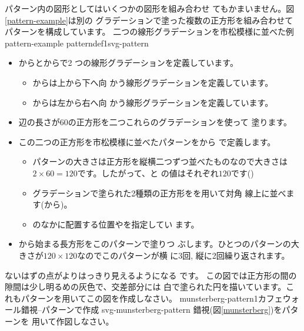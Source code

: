 パターン内の図形としてはいくつかの図形を組み合わせ
てもかまいません。図\ref{pattern-example}は別の
グラデーションで塗った複数の正方形を組み合わせてパターンを構成しています。
%
   {二つの線形グラデーションを市松模様に並べた例}
{pattern-example}
   {patterndef1}{svg-pattern}
\begin{itemize}
 \item {}からとからで2
       つの線形グラデーションを定義しています。
 \begin{itemize}
  \item {}からは上から下へ向
	かう線形グラデーションを定義しています。
  \item {}からは左から右へ向
	かう線形グラデーションを定義しています。
 \end{itemize}
 \item 辺の長さが$60$の正方形を二つこれらのグラデーションを使って
       塗ります。
 \item この二つの正方形を市松模様に並べたパターンをから
       で定義します。
\begin{itemize}
 \item パターンの大きさは正方形を縦横二つずつ並べたものなので大きさは
       $2\times60=120$です。したがって、と
       の値はそれぞれ$120$です()
 \item グラデーションで塗られた2種類の正方形をを用いて対角
       線上に並べます(から)。
 \item {}のなかに配置する位置やを指定してい
       ます。
\end{itemize}
 \item {}から始まる長方形をこのパターンで塗りつ
       ぶします。ひとつのパターンの大きさが$120\times120$なのでこのパターンが横
       に3回, 縦に2回繰り返されます。
\end{itemize}
\iffalse
\begin{Problem}\upshape
 傾いたグラデーションを市松模様に並べた図形を作成しなさい。なお、
各パターンは長方形の辺に平行でかまいません。
\end{Problem}
\fi

{}
{ないはずの点がよりはっきり見えるようになる
です。
この図では正方形の間の隙間は少し明るめの灰色で、交差部分には
白で塗られた円を描いています。これもパターンを用いてこの図を作成しなさい。}
%
%
\ProbwithSol%
{munsterberg-pattern1}{カフェウォール錯視--パターンで作成}
{svg-munsterberg-pattern}
{錯視(図\ref{munsterberg})をパターンを
用いて作図しなさい。}

